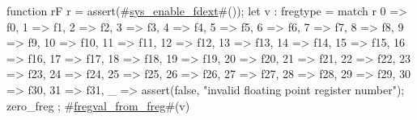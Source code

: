 function rF r = {
  assert(#\hyperref[sailRISCVzsyszyenablezyfdext]{sys\_enable\_fdext}#());
  let v : fregtype =
    match r {
      0 => f0,
      1 => f1,
      2 => f2,
      3 => f3,
      4 => f4,
      5 => f5,
      6 => f6,
      7 => f7,
      8 => f8,
      9 => f9,
      10 => f10,
      11 => f11,
      12 => f12,
      13 => f13,
      14 => f14,
      15 => f15,
      16 => f16,
      17 => f17,
      18 => f18,
      19 => f19,
      20 => f20,
      21 => f21,
      22 => f22,
      23 => f23,
      24 => f24,
      25 => f25,
      26 => f26,
      27 => f27,
      28 => f28,
      29 => f29,
      30 => f30,
      31 => f31,
      _  => {assert(false, "invalid floating point register number"); zero_freg}
    };
  #\hyperref[sailRISCVzfregvalzyfromzyfreg]{fregval\_from\_freg}#(v)
}
